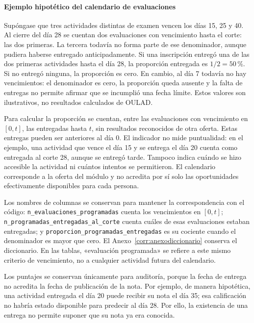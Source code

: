 \paragraph{Ejemplo hipotético del calendario de evaluaciones}
Supóngase que tres actividades distintas de examen vencen los días 15, 25 y 40. Al cierre del día 28 se cuentan dos evaluaciones con vencimiento hasta el corte: las dos primeras. La tercera todavía no forma parte de ese denominador, aunque pudiera haberse entregado anticipadamente. Si una inscripción entregó una de las dos primeras actividades hasta el día 28, la proporción entregada es $1/2=50\,\%$. Si no entregó ninguna, la proporción es cero. En cambio, al día 7 todavía no hay vencimientos: el denominador es cero, la proporción queda ausente y la falta de entregas no permite afirmar que se incumplió una fecha límite. Estos valores son ilustrativos, no resultados calculados de OULAD.

Para calcular la proporción se cuentan, entre las evaluaciones con vencimiento en $[0,t]$, las entregadas hasta $t$, sin resultados reconocidos de otra oferta. Estas entregas pueden ser anteriores al día 0. El indicador no mide puntualidad: en el ejemplo, una actividad que vence el día 15 y se entrega el día 20 cuenta como entregada al corte 28, aunque se entregó tarde. Tampoco indica cuándo se hizo accesible la actividad ni cuántos intentos se permitieron. El calendario corresponde a la oferta del módulo y no acredita por sí solo las oportunidades efectivamente disponibles para cada persona.

Los nombres de columnas se conservan para mantener la correspondencia con el código: \texttt{n\_\allowbreak{}evaluaciones\_\allowbreak{}programadas} cuenta los vencimientos en $[0,t]$; \texttt{n\_\allowbreak{}programadas\_\allowbreak{}entregadas\_\allowbreak{}al\_\allowbreak{}corte} cuenta cuáles de esas evaluaciones estaban entregadas; y \texttt{proporcion\_\allowbreak{}programadas\_\allowbreak{}entregadas} es su cociente cuando el denominador es mayor que cero. El Anexo~\ref{corr:anexodiccionario} conserva el diccionario. En las tablas, «evaluación programada» se refiere a este mismo criterio de vencimiento, no a cualquier actividad futura del calendario.

Los puntajes se conservan únicamente para auditoría, porque la fecha de entrega no acredita la fecha de publicación de la nota. Por ejemplo, de manera hipotética, una actividad entregada el día 20 puede recibir su nota el día 35; esa calificación no habría estado disponible para predecir al día 28. Por ello, la existencia de una entrega no permite suponer que su nota ya era conocida.

